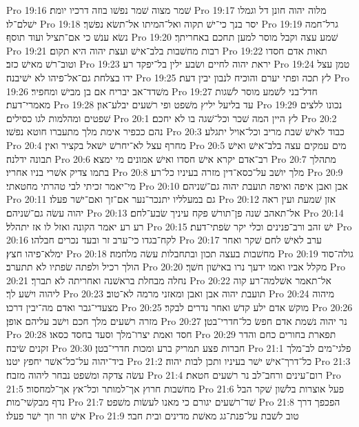 Pro 19:16  שׁמר מצוה שׁמר נפשׁו בוזה דרכיו יומת׃
Pro 19:17  מלוה יהוה חונן דל וגמלו ישׁלם־לו׃
Pro 19:18  יסר בנך כי־ישׁ תקוה ואל־המיתו אל־תשׂא נפשׁך׃
Pro 19:19  גרל־חמה נשׂא ענשׁ כי אם־תציל ועוד תוסף׃
Pro 19:20  שׁמע עצה וקבל מוסר למען תחכם באחריתך׃
Pro 19:21  רבות מחשׁבות בלב־אישׁ ועצת יהוה היא תקום׃
Pro 19:22  תאות אדם חסדו וטוב־רשׁ מאישׁ כזב׃
Pro 19:23  יראת יהוה לחיים ושׂבע ילין בל־יפקד רע׃
Pro 19:24  טמן עצל ידו בצלחת גם־אל־פיהו לא ישׁיבנה׃
Pro 19:25  לץ תכה ופתי יערם והוכיח לנבון יבין דעת׃
Pro 19:26  משׁדד־אב יבריח אם בן מבישׁ ומחפיר׃
Pro 19:27  חדל־בני לשׁמע מוסר לשׁגות מאמרי־דעת׃
Pro 19:28  עד בליעל יליץ משׁפט ופי רשׁעים יבלע־און׃
Pro 19:29  נכונו ללצים שׁפטים ומהלמות לגו כסילים׃
Pro 20:1  לץ היין המה שׁכר וכל־שׁגה בו לא יחכם׃
Pro 20:2  נהם ככפיר אימת מלך מתעברו חוטא נפשׁו׃
Pro 20:3  כבוד לאישׁ שׁבת מריב וכל־אויל יתגלע׃
Pro 20:4  מחרף עצל לא־יחרשׁ ישׁאל בקציר ואין׃
Pro 20:5  מים עמקים עצה בלב־אישׁ ואישׁ תבונה ידלנה׃
Pro 20:6  רב־אדם יקרא אישׁ חסדו ואישׁ אמונים מי ימצא׃
Pro 20:7  מתהלך בתמו צדיק אשׁרי בניו אחריו׃
Pro 20:8  מלך יושׁב על־כסא־דין מזרה בעיניו כל־רע׃
Pro 20:9  מי־יאמר זכיתי לבי טהרתי מחטאתי׃
Pro 20:10  אבן ואבן איפה ואיפה תועבת יהוה גם־שׁניהם׃
Pro 20:11  גם במעלליו יתנכר־נער אם־זך ואם־ישׁר פעלו׃
Pro 20:12  אזן שׁמעת ועין ראה יהוה עשׂה גם־שׁניהם׃
Pro 20:13  אל־תאהב שׁנה פן־תורשׁ פקח עיניך שׂבע־לחם׃
Pro 20:14  רע רע יאמר הקונה ואזל לו אז יתהלל׃
Pro 20:15  ישׁ זהב ורב־פנינים וכלי יקר שׂפתי־דעת׃
Pro 20:16  לקח־בגדו כי־ערב זר ובעד נכרים חבלהו׃
Pro 20:17  ערב לאישׁ לחם שׁקר ואחר ימלא־פיהו חצץ׃
Pro 20:18  מחשׁבות בעצה תכון ובתחבלות עשׂה מלחמה׃
Pro 20:19  גולה־סוד הולך רכיל ולפתה שׂפתיו לא תתערב׃
Pro 20:20  מקלל אביו ואמו ידעך נרו באישׁון חשׁך׃
Pro 20:21  נחלה מבחלת בראשׁנה ואחריתה לא תברך׃
Pro 20:22  אל־תאמר אשׁלמה־רע קוה ליהוה וישׁע לך׃
Pro 20:23  תועבת יהוה אבן ואבן ומאזני מרמה לא־טוב׃
Pro 20:24  מיהוה מצעדי־גבר ואדם מה־יבין דרכו׃
Pro 20:25  מוקשׁ אדם ילע קדשׁ ואחר נדרים לבקר׃
Pro 20:26  מזרה רשׁעים מלך חכם וישׁב עליהם אופן׃
Pro 20:27  נר יהוה נשׁמת אדם חפשׂ כל־חדרי־בטן׃
Pro 20:28  חסד ואמת יצרו־מלך וסעד בחסד כסאו׃
Pro 20:29  תפארת בחורים כחם והדר זקנים שׂיבה׃
Pro 20:30  חברות פצע תמריק ברע ומכות חדרי־בטן׃
Pro 21:1  פלגי־מים לב־מלך ביד־יהוה על־כל־אשׁר יחפץ יטנו׃
Pro 21:2  כל־דרך־אישׁ ישׁר בעיניו ותכן לבות יהוה׃
Pro 21:3  עשׂה צדקה ומשׁפט נבחר ליהוה מזבח׃
Pro 21:4  רום־עינים ורחב־לב נר רשׁעים חטאת׃
Pro 21:5  מחשׁבות חרוץ אך־למותר וכל־אץ אך־למחסור׃
Pro 21:6  פעל אוצרות בלשׁון שׁקר הבל נדף מבקשׁי־מות׃
Pro 21:7  שׁד־רשׁעים יגורם כי מאנו לעשׂות משׁפט׃
Pro 21:8  הפכפך דרך אישׁ וזר וזך ישׁר פעלו׃
Pro 21:9  טוב לשׁבת על־פנת־גג מאשׁת מדינים ובית חבר׃
